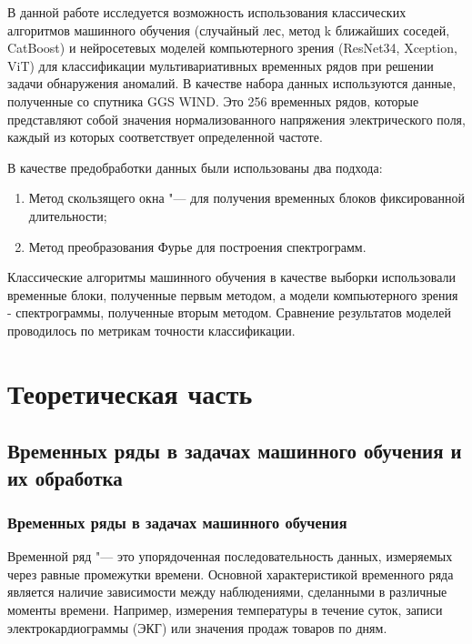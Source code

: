 \documentclass[spec, och, diploma]{SCWorks}
\begin{document}
    В данной работе исследуется возможность использования классических
    алгоритмов машинного обучения (случайный лес, метод k ближайших соседей,
    CatBoost) и нейросетевых моделей компьютерного зрения (ResNet34, Xception,
    ViT) для классификации мультивариативных временных рядов при решении задачи
    обнаружения аномалий. В качестве набора данных используются данные,
    полученные со спутника GGS WIND. Это 256 временных рядов, которые
    представляют собой значения нормализованного напряжения электрического поля,
    каждый из которых соответствует определенной частоте.
    
    В качестве предобработки данных были использованы два подхода:
    \begin{enumerate}
        \item Метод скользящего окна "--- для получения временных блоков
        фиксированной длительности;
        \item Метод преобразования Фурье для построения спектрограмм.
    \end{enumerate}
    
    Классические алгоритмы машинного обучения в качестве выборки использовали
    временные блоки, полученные первым методом, а модели компьютерного зрения -
    спектрограммы, полученные вторым методом. Сравнение результатов моделей
    проводилось по метрикам точности классификации.

\section{Теоретическая часть}

    \subsection{Временных ряды в задачах машинного обучения и их обработка}
    
        \subsubsection{Временных ряды в задачах машинного обучения}

            Временной ряд "--- это упорядоченная последовательность данных,
            измеряемых через равные промежутки времени. Основной характеристикой
            временного ряда является наличие зависимости между наблюдениями,
            сделанными в различные моменты времени. Например, измерения температуры
            в течение суток, записи электрокардиограммы (ЭКГ) или значения продаж
            товаров по дням.
\end{document}
